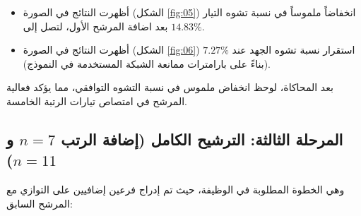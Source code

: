 \documentclass[12pt, a4paper, twoside]{article} %
\newcommand{\el}{\textenglish} %
\begin{document}
  \newpage

\begin{itemize}
  \item أظهرت النتائج في الصورة (الشكل \ref{fig:05}) انخفاضاً ملموساً في نسبة تشوه التيار بعد اضافة المرشح الأول، لتصل إلى \el{\boldmath $14.83\%$}.
  \item أظهرت النتائج في الصورة (الشكل \ref{fig:06}) استقرار نسبة تشوه الجهد عند \el{\boldmath $7.27\%$} (بناءً على بارامترات ممانعة الشبكة المستخدمة في النموذج).
\end{itemize}

بعد المحاكاة، لوحظ انخفاض ملموس في نسبة التشوه التوافقي، مما يؤكد فعالية المرشح في امتصاص تيارات الرتبة الخامسة.

\subsection{المرحلة الثالثة: الترشيح الكامل (إضافة الرتب $n=7$ و $n=11$)}
وهي الخطوة المطلوبة في الوظيفة، حيث تم إدراج فرعين إضافيين على التوازي مع المرشح السابق:
\end{document}
